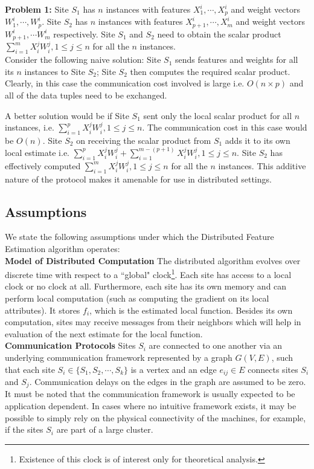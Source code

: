 \noindent \textbf{Problem 1: } Site $S_1$ has $n$ instances with features $X_1^i, \cdots, X_p^i$ and weight vectors $W_1^i, \cdots, W_p^i$. Site $S_2$ has $n$ instances with features $X_{p+1}^i, \cdots, X_m^i$ and weight vectors $W_{p+1}^i, \cdots W_m^i$ respectively. Site $S_1$ and $S_2$ need to obtain the scalar product $\sum_{i=1}^{m} X_i^j W_i^j, 1 \le j \le n$ for all the $n$ instances.  \\

Consider the following naive solution: Site $S_1$ sends features and weights for all its $n$ instances to Site $S_2$; Site $S_2$ then computes the required scalar product. Clearly, in this case the communication cost involved is large i.e. $O(n \times p)$ and all of the data tuples need to be exchanged. 

A better solution would be if Site $S_1$ sent only the local scalar product for all $n$ instances, i.e. $\sum_{i=1}^{p} X_i^j W_i^j, 1 \le j \le n$. The communication cost in this case would be $O(n)$. Site $S_2$ on receiving the scalar product from $S_1$ adds it to its own local estimate i.e. $\sum_{i=1}^{p} X_i^j W_i^j +\sum_{i=1}^{m-(p+1)} X_i^j W_i^j  , 1 \le j \le n$. Site $S_2$ has effectively computed $\sum_{i=1}^{m} X_i^j W_i^j, 1 \le j \le n$ for all the $n$ instances. This additive nature of the protocol makes it amenable for use in distributed settings. 

\subsection{Assumptions}
\label{assum}

We state the following assumptions under which the Distributed Feature Estimation algorithm operates: \\

\noindent \textbf{Model of Distributed Computation} The distributed algorithm evolves over discrete time with respect to a ``global" clock\footnote{Existence of this clock is of interest only for theoretical analysis.}. Each site has access to a local clock or no clock at all. Furthermore, each site has its own memory and can perform local computation (such as computing the gradient on its local attributes). It stores $f_i$, which is the estimated local function. Besides its own computation, sites may receive messages from their neighbors which will help in evaluation of the next estimate for the local function.\\

\noindent \textbf{Communication Protocols} Sites $S_i$ are connected to one another via an underlying communication framework represented by a graph $G (V, E)$, such that each site  $S_i \in \{S_1, S_2, \cdots , S_k\}$ is a vertex and an edge $e_{ij} \in E$ connects sites $S_i$ and $S_j$. Communication delays on the edges in the graph are assumed to be zero. It must be noted that the communication framework is usually expected to be application dependent. In cases where no intuitive framework exists, it may be possible to simply rely on the physical connectivity of the machines, for example, if the sites $S_i$ are part of a large cluster. \\


